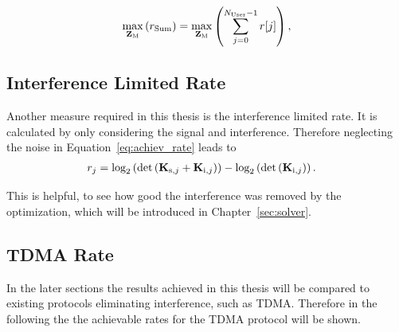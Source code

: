 \begin{equation}
\label{eq:achiev_sum_rate}
\max_{\mathbf{Z}_\text{M}}\left(r_\text{Sum}\right) = \max_{\mathbf{Z}_\text{M}}\left(\sum_{j=0}^{N_\text{User}-1} r[j]\right),
\end{equation}

\subsection{Interference Limited Rate}
\label{sec:sir_rate}
Another measure required in this thesis is the interference limited rate.
It is calculated by only considering the signal and interference.
Therefore neglecting the noise in Equation~\ref{eq:achiev_rate} leads to
\begin{align}
\label{eq:sir_rate}
r_j &=\text{log}_2\left(\text{det}\left(\mathbf{K}_{\text{s},j}+\mathbf{K}_{\text{i},j}\right)\right) -
	     	\text{log}_2\left(\text{det}\left(\mathbf{K}_{\text{i},j}\right)\right).
\end{align}

This is helpful, to see how good the interference was removed by the optimization, which will be introduced in Chapter~\ref{sec:solver}.



\subsection{TDMA Rate}
\label{sec:tdma_rate}
In the later sections the results achieved in this thesis will be compared to existing protocols eliminating interference, such as TDMA.
Therefore in the following the the achievable rates for the TDMA protocol will be shown.

